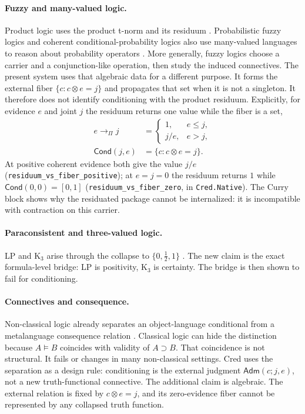 \documentclass[11pt,a4paper]{article}
\newcommand{\Cond}{\mathsf{Cond}}
\newcommand{\Adm}{\mathsf{Adm}}
\newcommand{\conjc}{\otimes}
\newcommand{\half}{\tfrac12}
\newcommand{\Lean}[1]{\texttt{#1}}
\begin{document}
\paragraph{Fuzzy and many-valued logic.}
Product logic uses the product t-norm and its residuum
\cite{hajek1998,esteva2001,cintula2011}.  Probabilistic fuzzy logics
and coherent conditional-probability logics also use many-valued
languages to reason about probability operators
\cite{hajek1995,flaminio2009,godo2006}.  More generally, fuzzy logics
choose a carrier and a conjunction-like operation, then study the
induced connectives.  The present system uses that algebraic data for
a different purpose.  It forms the external fiber
$\{c:c\conjc e=j\}$ and propagates that set when it is not a singleton.
It therefore does not identify conditioning with the product residuum.
Explicitly, for evidence $e$ and joint $j$ the residuum returns one
value while the fiber is a set,
\[
\begin{aligned}
  e\to_\Pi j&=
  \begin{cases}1,&e\le j,\\ j/e,&e>j,\end{cases}\\
  \Cond(j,e)&=\{c:c\conjc e=j\}.
\end{aligned}
\]
At positive coherent evidence both give the value $j/e$
(\Lean{residuum\_vs\_fiber\_positive}); at $e=j=0$ the residuum returns
$1$ while $\Cond(0,0)=[0,1]$ (\Lean{residuum\_vs\_fiber\_zero}, in
\texttt{Cred.Native}).  The Curry block shows
why the residuated package cannot be internalized: it is incompatible
with contraction on this carrier.

\paragraph{Paraconsistent and three-valued logic.}
LP and K$_3$ arise through the collapse to
$\{0,\half,1\}$ \cite{kleene1952,asenjo1966,priest1979,belnap1977}.
The new claim is the exact formula-level bridge:
LP is positivity, K$_3$ is certainty.  The bridge is then shown to fail
for conditioning.

\paragraph{Connectives and consequence.}
Non-classical logic already separates an object-language conditional
from a metalanguage consequence relation \cite{priest2008,anderson1975}.
Classical logic can hide the distinction because $A\models B$ coincides
with validity of $A\supset B$.  That coincidence is not structural.  It
fails or changes in many non-classical settings.  Cred uses the
separation as a design rule: conditioning is the external judgment
$\Adm(c;j,e)$, not a new truth-functional connective.  The additional
claim is algebraic.  The external relation is fixed by $c\conjc e=j$,
and its zero-evidence fiber cannot be represented by any collapsed
truth function.
\end{document}
